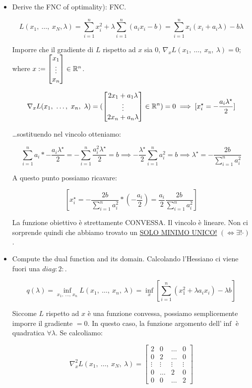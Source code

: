 \begin{itemize}
\item{Derive the FNC of optimality)}: FNC.

\[	
	L(x_1,\ \dots,\ x_N,\lambda) = \sum_{i=1}^n{x_i^2} + \lambda\sum_{i=1}^n{(a_ix_i-b)} = \sum_{i=1}^n{x_i(x_i+a_i\lambda)} - b\lambda
\]

Imporre che il gradiente di $L$ rispetto ad $x$ sia 0, $\nabla_x{L(x_1,\ \dots,\ x_n,\ \lambda)}= 0$; where $x := \begin{bmatrix}x_1\\ \vdots\\x_n\end{bmatrix}\in\mathbb{R}^n$.

\[
	\nabla_x{L(x_1,\ \dots,\ x_n,\ \lambda)} = (\begin{bmatrix}2x_1+a_1\lambda\\ \vdots\\2x_n+a_n\lambda\end{bmatrix}\in\mathbb{R}^n) = 0 \implies [x_i^\star = -\frac{a_i\lambda^\star}{2}]
\]

\dots sostituendo nel vincolo otteniamo:

\[
	\sum_{i=1}^n{a_i*-\frac{a_i\lambda^\star}{2}} = -\sum_{i=1}^n{\frac{a_i^2\lambda^\star}{2}} = b \implies -\frac{\lambda^\star}{2}\sum_{i=1}^n{a_i^2} = b \implies \lambda^\star = -\frac{2b}{\sum_{i=1}^n{a_i^2}}
\]

A questo punto possiamo ricavare:

\[
	[x_i^\star = -\frac{2b}{\sum_{i=1}^n{a_i^2}}*(-\frac{a_i}{2}) = \frac{a_i}{2}\frac{2b}{\sum_{i=1}^n{a_i^2}}]
\]

La funzione obiettivo è strettamente CONVESSA. Il vincolo è lineare. Non ci sorprende quindi che abbiamo trovato un \underline{SOLO MINIMO UNICO!} $(\iff \exists! \mathord{\cdot})$.

\item Compute the dual function and its domain. Calcolando l'Hessiano ci viene fuori una $diag{:2:}$.

\[
	q(\lambda) = \inf_{x_1,\ \dots,\ x_n}{L(x_1,\ \dots,\ x_n,\ \lambda)} = \inf_x{[\sum_{i=1}^n{(x_1^2 + \lambda a_ix_i)} -\lambda b]}
\]

Siccome $L$ rispetto ad $x$ è una funzione convessa, possiamo semplicemente imporre il gradiente $= 0$. In questo caso, la funzione argomento dell'$\inf$ è quadratica $\forall\lambda$. Se calcoliamo:

\[
	\nabla^2_x{L(x_1,\ \dots,\ x_N,\ \lambda)} = \begin{bmatrix}2&0&\dots&0\\0&2&\dots&0\\ \vdots&\vdots&\vdots&\vdots\\0&\dots&2&0\\0&0&\dots&2\end{bmatrix}
\]


\end{itemize}
